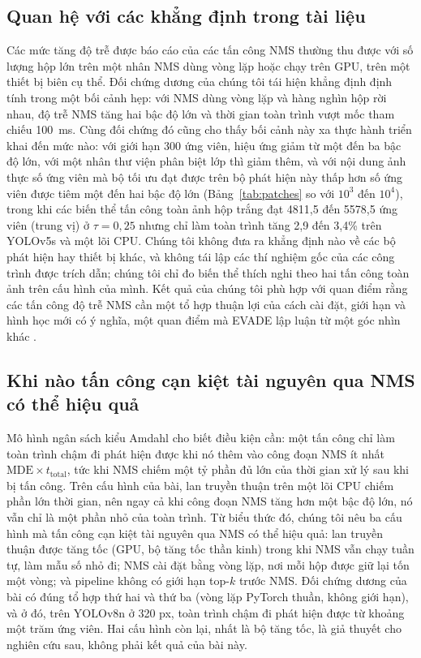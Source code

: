\documentclass[a4paper,fleqn]{cas-dc}
\begin{document}
\subsection{Quan hệ với các khẳng định trong tài liệu}
Các mức tăng độ trễ được báo cáo của các tấn công NMS thường thu được với số lượng hộp lớn trên một nhân NMS dùng vòng lặp hoặc chạy trên GPU, trên một thiết bị biên cụ thể. Đối chứng dương của chúng tôi tái hiện khẳng định định tính trong một bối cảnh hẹp: với NMS dùng vòng lặp và hàng nghìn hộp rời nhau, độ trễ NMS tăng hai bậc độ lớn và thời gian toàn trình vượt mốc tham chiếu 100~ms. Cùng đối chứng đó cũng cho thấy bối cảnh này xa thực hành triển khai đến mức nào: với giới hạn 300 ứng viên, hiệu ứng giảm từ một đến ba bậc độ lớn, với một nhân thư viện phân biệt lớp thì giảm thêm, và với nội dung ảnh thực số ứng viên mà bộ tối ưu đạt được trên bộ phát hiện này thấp hơn số ứng viên được tiêm một đến hai bậc độ lớn (Bảng~\ref{tab:patches} so với $10^3$ đến $10^4$), trong khi các biến thể tấn công toàn ảnh hộp trắng đạt 4811,5 đến 5578,5 ứng viên (trung vị) ở $\tau=0{,}25$ nhưng chỉ làm toàn trình tăng 2,9 đến 3,4\% trên YOLOv5s và một lõi CPU. Chúng tôi không đưa ra khẳng định nào về các bộ phát hiện hay thiết bị khác, và không tái lập các thí nghiệm gốc của các công trình được trích dẫn; chúng tôi chỉ đo biến thể thích nghi theo hai tấn công toàn ảnh trên cấu hình của mình. Kết quả của chúng tôi phù hợp với quan điểm rằng các tấn công độ trễ NMS cần một tổ hợp thuận lợi của cách cài đặt, giới hạn và hình học mới có ý nghĩa, một quan điểm mà EVADE lập luận từ một góc nhìn khác \cite{evade2025}.

\subsection{Khi nào tấn công cạn kiệt tài nguyên qua NMS có thể hiệu quả}
Mô hình ngân sách kiểu Amdahl cho biết điều kiện cần: một tấn công chỉ làm toàn trình chậm đi phát hiện được khi nó thêm vào công đoạn NMS ít nhất $\mathrm{MDE}\times t_{\mathrm{total}}$, tức khi NMS chiếm một tỷ phần đủ lớn của thời gian xử lý sau khi bị tấn công. Trên cấu hình của bài, lan truyền thuận trên một lõi CPU chiếm phần lớn thời gian, nên ngay cả khi công đoạn NMS tăng hơn một bậc độ lớn, nó vẫn chỉ là một phần nhỏ của toàn trình. Từ biểu thức đó, chúng tôi nêu ba cấu hình mà tấn công cạn kiệt tài nguyên qua NMS có thể hiệu quả: lan truyền thuận được tăng tốc (GPU, bộ tăng tốc thần kinh) trong khi NMS vẫn chạy tuần tự, làm mẫu số nhỏ đi; NMS cài đặt bằng vòng lặp, nơi mỗi hộp được giữ lại tốn một vòng; và pipeline không có giới hạn top-$k$ trước NMS. Đối chứng dương của bài có đúng tổ hợp thứ hai và thứ ba (vòng lặp PyTorch thuần, không giới hạn), và ở đó, trên YOLOv8n ở 320 px, toàn trình chậm đi phát hiện được từ khoảng một trăm ứng viên. Hai cấu hình còn lại, nhất là bộ tăng tốc, là giả thuyết cho nghiên cứu sau, không phải kết quả của bài này.
\end{document}
